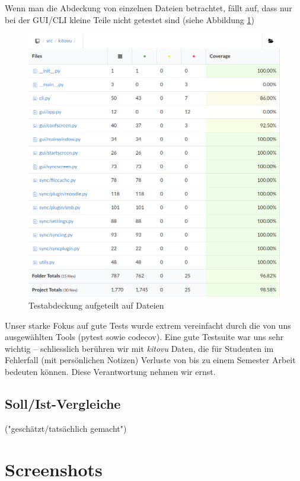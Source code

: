 \documentclass[a4paper]{article}
\let\oldsection\section
\renewcommand\section{\clearpage\oldsection}
\begin{document}
Wenn man die Abdeckung von einzelnen Dateien betrachtet, fällt auf, dass nur bei
der GUI/CLI kleine Teile nicht getestet sind (siehe Abbildung \ref{img:files})

\begin{figure}
  \label{img:files}
  \caption{Testabdeckung aufgeteilt auf Dateien}
\includegraphics[width=\linewidth]{img/coverage_files.png}
\end{figure}

Unser starke Fokus auf gute Tests wurde extrem vereinfacht durch die von uns
ausgewählten Tools (pytest sowie codecov). Eine gute Testsuite war uns sehr
wichtig -- schliesslich berühren wir mit \emph{kitovu} Daten, die für Studenten
im Fehlerfall (mit persönlichen Notizen) Verluste von bis zu einem Semester
Arbeit bedeuten können. Diese Verantwortung nehmen wir ernst.

\subsection{Soll/Ist-Vergleiche}

 ("geschätzt/tatsächlich gemacht")


\section{Screenshots}
\end{document}
